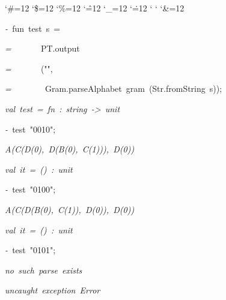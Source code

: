 \begin{list}{}
{\setlength{\leftmargin}{\leftmargini}
\setlength{\rightmargin}{0cm}
\setlength{\itemindent}{0cm}
\setlength{\listparindent}{0cm}
\setlength{\itemsep}{0cm}
\setlength{\parsep}{0cm}
\setlength{\labelsep}{0cm}
\setlength{\labelwidth}{0cm}
\catcode`\#=12
\catcode`\$=12
\catcode`\%=12
\catcode`\^=12
\catcode`\_=12
\catcode`\.=12
\catcode`
\catcode`
\catcode`\&=12
\ttfamily}
\small
\item[]\textsl{-\ }fun\ test\ s\ =
\item[]\textsl{=\ }\ \ \ \ \ \ PT.output
\item[]\textsl{=\ }\ \ \ \ \ \ ("",
\item[]\textsl{=\ }\ \ \ \ \ \ \ Gram.parseAlphabet\ gram\ (Str.fromString\ s));
\item[]\textsl{val\ test\ =\ fn\ :\ string\ ->\ unit}
\item[]\textsl{-\ }test\ "0010";
\item[]\textsl{A(C(D(0),\ D(B(0),\ C(1))),\ D(0))}
\item[]\textsl{val\ it\ =\ ()\ :\ unit}
\item[]\textsl{-\ }test\ "0100";
\item[]\textsl{A(C(D(B(0),\ C(1)),\ D(0)),\ D(0))}
\item[]\textsl{val\ it\ =\ ()\ :\ unit}
\item[]\textsl{-\ }test\ "0101";
\item[]\textsl{no\ such\ parse\ exists}
\item[]
\item[]\textsl{uncaught\ exception\ Error}
\end{list}
